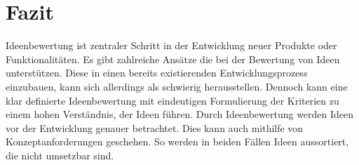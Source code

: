 \section{Fazit}\label{sec:fazit}
Ideenbewertung ist zentraler Schritt in der Entwicklung neuer Produkte oder Funktionalitäten. Es gibt zahlreiche 
Ansätze die bei der Bewertung von Ideen unterstützen. Diese in einen bereits existierenden Entwicklungsprozess einzubauen, 
kann sich allerdings als schwierig herausstellen.
Dennoch kann eine klar definierte Ideenbewertung mit eindeutigen Formulierung der Kriterien zu einem hohen Verständnis, 
der Ideen führen. Durch Ideenbewertung werden Ideen vor der Entwicklung genauer betrachtet. Dies kann auch mithilfe von 
Konzeptanforderungen geschehen. So werden in beiden Fällen Ideen aussortiert, die nicht umsetzbar sind. 
